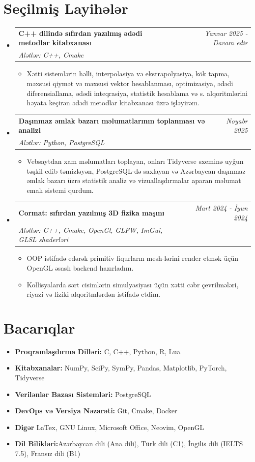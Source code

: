 \documentclass[a4paper,11pt]{article}
\makeatletter
\newcommand{\resumeItem}[2]{
\item{
        \textbf{#1}{\hspace{0.5mm}#2 \vspace{-0.5mm}}
    }
}
\newcommand{\resumeProject}[4]{
    \vspace{-0.5mm}
\item
    \begin{tabular*}{0.98\textwidth}[t]{l@{\extracolsep{\fill}}r}
        \textbf{#1} & \textit{\footnotesize{#3}} \\
        \footnotesize{\textit{#2}} & \footnotesize{#4}
    \end{tabular*}
    \vspace{-3mm}
}
\newcommand{\resumeSubItem}[2]{\resumeItem{#1}{#2}\vspace{-4pt}}
\newcommand{\resumeSubHeadingListStart}{
\begin{itemize}[leftmargin=*,labelsep=1mm]}
\newcommand{\resumeHeadingSkillStart}{
        \begin{itemize}[leftmargin=*,itemsep=0.8mm, rightmargin=2ex]}
\newcommand{\resumeItemListStart}{
                \begin{itemize}[leftmargin=*,labelsep=1mm,itemsep=0.5mm]}
\newcommand{\resumeSubHeadingListEnd}{
                    \end{itemize}\vspace{-2mm}}
\newcommand{\resumeHeadingSkillEnd}{
            \end{itemize}\vspace{-2mm}}
\newcommand{\resumeItemListEnd}{
    \end{itemize}\vspace{-2mm}}
\makeatother
\begin{document}
\section{\textbf{Seçilmiş Layihələr}}
\resumeSubHeadingListStart


\resumeProject
{C++ dilində sıfırdan yazılmış ədədi metodlar kitabxanası}
{Alətlər: C++, Cmake}
{Yanvar 2025 - Davam edir}
{{}\href{https://github.com/JosephMehdiyev/linsolver}{\textcolor{darkblue}{\faGithub}}}
\resumeItemListStart
\item Xətti sistemlərin həlli, interpolasiya və ekstrapolyasiya, kök tapma, məxsusi qiymət və məxsusi vektor hesablanması, optimizasiya, ədədi diferensiallama, ədədi inteqrasiya, statistik hesablama və s. alqoritmlərini həyata keçirən ədədi metodlar kitabxanası üzrə işləyirəm.
\resumeItemListEnd

\resumeProject
{Daşınmaz əmlak bazarı məlumatlarının toplanması və analizi}
{Alətlər: Python, PostgreSQL}
{Noyabr 2025}
{{}\href{https://github.com/JosephMehdiyev/az-realestate-analytics}{\textcolor{darkblue}{\faGithub}}}
\resumeItemListStart
\item Vebsaytdan xam məlumatları toplayan, onları Tidyverse sxeminə uyğun təşkil edib təmizləyən, PostgreSQL-də saxlayan və Azərbaycan daşınmaz əmlak bazarı üzrə statistik analiz və vizuallaşdırmalar aparan məlumat emalı sistemi qurdum.
\resumeItemListEnd
\resumeProject
{Cormat: sıfırdan yazılmış 3D fizika maşını}
{Alətlər: C++, Cmake, OpenGl, GLFW, ImGui, GLSL shaderləri}
{Mart 2024 - İyun 2024}
{{}\href{https://github.com/JosephMehdiyev/cormat}{\textcolor{darkblue}{\faGithub}}}
\resumeItemListStart
\item OOP istifadə edərək primitiv fiqurların mesh-lərini render etmək üçün OpenGL əsaslı backend hazırladım.
\item Kollisyalarda sərt cisimlərin simulyasiyası üçün xətti cəbr çevrilmələri, riyazi və fiziki alqoritmlərdən istifadə etdim.
\resumeItemListEnd

\resumeSubHeadingListEnd

\vspace{-3mm}
\section{\textbf{Bacarıqlar}}
\resumeHeadingSkillStart
\resumeSubItem{Proqramlaşdırma Dilləri:}
{ C, C++, Python, R, Lua}
\resumeSubItem{Kitabxanalar:}
{ NumPy, SciPy, SymPy, Pandas, Matplotlib, PyTorch, Tidyverse}
\resumeSubItem{Verilənlər Bazası Sistemləri:}
{ PostgreSQL}
\resumeSubItem{DevOps və Versiya Nəzarəti:}
{ Git, Cmake, Docker }
\resumeSubItem{Digər}
{ LaTex, GNU Linux, Microsoft Office, Neovim, OpenGL}
\resumeSubItem{Dil Bilikləri:}
{Azərbaycan dili (Ana dili), Türk dili (C1), İngilis dili (IELTS 7.5), Fransız dili (B1)}
\resumeHeadingSkillEnd
\end{document}
